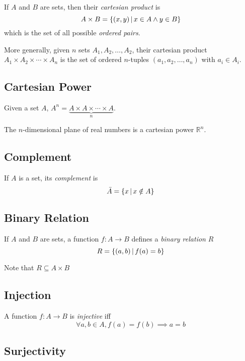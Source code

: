 \documentclass{article}
\begin{document}
If \(A\) and \(B\) are sets, then their \textit{cartesian product} is
\[
    A\times B = \{(x,y) \,|\, x \in A \land y \in B\}
\]
which is the set of all possible \textit{ordered pairs}.

More generally, given \(n\) sets \(A_1, A_2, \ldots, A_2\),
their cartesian product \(A_1 \times A_2 \times \cdots \times A_n\)
is the set of ordered \(n\)-tuples \((a_1, a_2, \ldots, a_n)\) with \(a_i\in A_i\).

\subsection{Cartesian Power}

Given a set \(A\), \(A^n=\underbrace{A\times A\times \cdots \times A}_n\).

The \(n\)-dimensional plane of real numbers is a cartesian power \({\mathbb{R}}^n\).

\subsection{Complement}

If \(A\) is a set, its \textit{complement} is
\[
    \bar{A} = \{x \,|\, x \notin A\}
\]

\subsection{Binary Relation}

If \(A\) and \(B\) are sets, a function \(f:A\to B\)
defines a \textit{binary relation} \(R\)
\[
    R = \{(a,b) \,|\, f(a)=b\}
\]

Note that \(R\subseteq A\times B\)



\subsection{Injection}

A function \(f:A\to B\) is \textit{injective} iff
\[
    \forall a,b \in A, f(a) = f(b) \implies a = b
\]

\subsection{Surjectivity}
\end{document}
